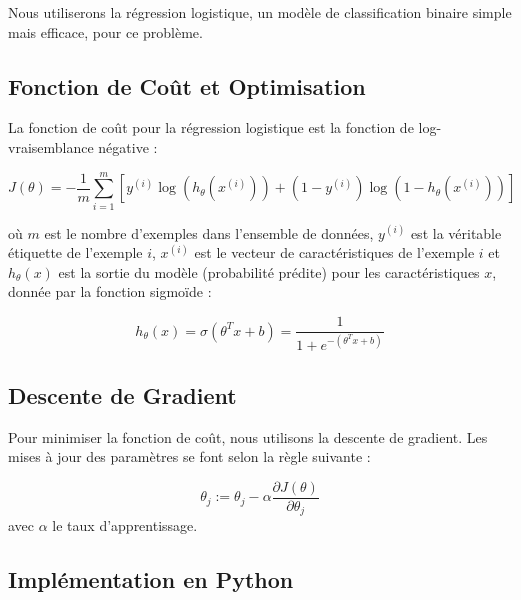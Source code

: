 \documentclass[12pt,a4paper,openay]{book}
\numberwithin{equation}{chapter}
\newcommand{\al}{\alpha}
\begin{document}
	Nous utiliserons la r\'egression logistique, un mod\`ele de classification binaire simple mais efficace, pour ce probl\`eme.
		
		 \subsection*{Fonction de Coût et Optimisation}
		
		La fonction de coût pour la r\'egression logistique est la fonction de log-vraisemblance n\'egative :
		
		\[ J(\theta) = -\frac{1}{m} \sum_{i=1}^{m} [y^{(i)} \log(h_\theta(x^{(i)})) + (1 - y^{(i)}) \log(1 - h_\theta(x^{(i)}))] \]
		
		o\`u $m$ est le nombre d'exemples dans l'ensemble de donn\'ees, $y^{(i)}$ est la v\'eritable \'etiquette de l'exemple $i$, $x^{(i)}$ est le vecteur de caract\'eristiques de l'exemple $i$ et $ h_\theta(x)$ est la sortie du modèle (probabilité prédite) pour les caractéristiques $x$, donnée par la fonction sigmoïde :
		 
		  \[h_\theta(x) = \sigma(\theta^T x + b) = \frac{1}{1 + e^{-(\theta^T x + b)}} \label{eq31}
		  \]
		\subsection*{ Descente de Gradient}
		
		Pour minimiser la fonction de coût, nous utilisons la descente de gradient. Les mises \`a jour des param\`etres se font selon la r\`egle suivante :
		
		\[ \theta_j := \theta_j - \alpha \frac{\partial J(\theta)}{\partial \theta_j} \] avec $\al$ le taux d'apprentissage.
		
		 \subsection*{Impl\'ementation en Python}
		
\end{document}
